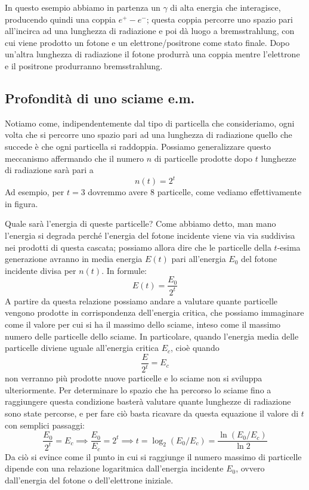 In questo esempio abbiamo in partenza un $\gamma$ di alta energia che interagisce, producendo quindi una coppia $e^+ - e^-$; questa coppia percorre uno spazio pari all'incirca ad una lunghezza di radiazione e poi dà luogo a bremsstrahlung, con cui viene prodotto un fotone e un elettrone/positrone come stato finale. Dopo un'altra lunghezza di radiazione il fotone produrrà una coppia mentre l'elettrone e il positrone produrranno bremsstrahlung.

\subsection{Profondità di uno sciame e.m.}

Notiamo come, indipendentemente dal tipo di particella che consideriamo, ogni volta che si percorre uno spazio pari ad una lunghezza di radiazione quello che succede è che ogni particella si raddoppia. Possiamo generalizzare questo meccanismo affermando che il numero $n$ di particelle prodotte dopo $t$ lunghezze di radiazione sarà pari a
\begin{equation*}
    n(t)=2^t
\end{equation*}
Ad esempio, per $t=3$ dovremmo avere 8 particelle, come vediamo effettivamente in figura.

Quale sarà l'energia di queste particelle? Come abbiamo detto, man mano l'energia si degrada perché l'energia del fotone incidente viene via via suddivisa nei prodotti di questa cascata; possiamo allora dire che le particelle della $t$-esima generazione avranno in media energia $E(t)$ pari all'energia $E_0$ del fotone incidente divisa per $n(t)$. In formule:
\begin{equation*}
    E(t)=\frac{E_0}{2^t}
\end{equation*}
A partire da questa relazione possiamo andare a valutare quante particelle vengono prodotte in corrispondenza dell'energia critica, che possiamo immaginare come il valore per cui si ha il massimo dello sciame, inteso come il massimo numero delle particelle dello sciame. In particolare, quando l'energia media delle particelle diviene uguale all'energia critica $E_c$, cioè quando
\begin{equation*}
    \frac{E}{2^t}=E_c
\end{equation*}
non verranno più prodotte nuove particelle e lo sciame non si sviluppa ulteriormente. Per determinare lo spazio che ha percorso lo sciame fino a raggiungere questa condizione basterà valutare quante lunghezze di radiazione sono state percorse, e per fare ciò basta ricavare da questa equazione il valore di $t$ con semplici passaggi:
\begin{equation*}
    \frac{E_0}{2^t}=E_c
    \implies
    \frac{E_0}{E_c}=2^t
    \implies
    t
    =\log_2{(E_0/E_c)}
    =\frac{\ln{(E_0/E_c)}}{\ln{2}}
\end{equation*}
Da ciò si evince come il punto in cui si raggiunge il numero massimo di particelle dipende con una relazione logaritmica dall'energia incidente $E_0$, ovvero dall'energia del fotone o dell'elettrone iniziale.

